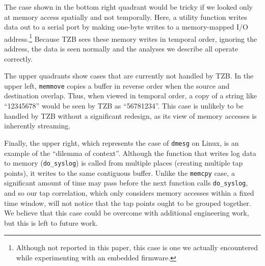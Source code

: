 The case shown in the bottom right quadrant would be tricky if we looked
only at memory access spatially and not temporally. Here, a utility
function writes data out to a serial port by making one-byte writes to a
memory-mapped I/O address.\footnote{Although not reported in this paper,
this case is one we actually encountered while experimenting with an
embedded firmware.} Because TZB sees these memory writes in
temporal order, ignoring the address, the data is seen normally and the
analyses we describe all operate correctly.

The upper quadrants show cases that are currently not handled by TZB. In
the upper left, \texttt{memmove} copies a buffer in reverse order when
the source and destination overlap. Thus, when viewed in temporal order,
a copy of a string like ``12345678'' would be seen by TZB as
``56781234''. This case is unlikely to be handled by TZB without a
significant redesign, as its view of memory accesses is inherently
streaming.

Finally, the upper right, which represents the case of \texttt{dmesg} on
Linux, is an example of the ``dilemma of context''. Although the
function that writes log data to memory (\texttt{do\_syslog}) is called
from multiple places (creating multiple tap points), it writes to the
same contiguous buffer. Unlike the \texttt{memcpy} case, a significant
amount of time may pass before the next function calls
\texttt{do\_syslog}, and so our tap correlation, which only considers
memory accesses within a fixed time window, will not notice that the tap
points ought to be grouped together. We believe that this case could be
overcome with additional engineering work, but this is left to future
work.
